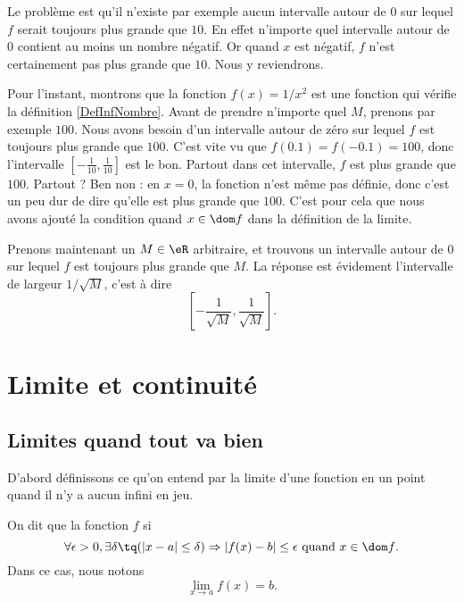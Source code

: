 Le problème est qu'il n'existe par exemple aucun intervalle autour de $0$ sur lequel $f$ serait toujours plus grande que $10$. En effet n'importe quel intervalle autour de $0$ contient au moins un nombre négatif. Or quand $x$ est négatif, $f$ n'est certainement pas plus grande que $10$. Nous y reviendrons.

Pour l'instant, montrons que la fonction $f(x)=1/x^2$ est une fonction qui vérifie la définition \ref{DefInfNombre}.  Avant de prendre n'importe quel $M$, prenons par exemple $100$. Nous avons besoin d'un intervalle autour de zéro sur lequel $f$ est toujours plus grande que $100$. C'est vite vu que $f(0.1)=f(-0.1)=100$, donc l'intervalle $[-\frac{ 1 }{ 10 },\frac{1}{ 10 }]$ est le bon. Partout dans cet intervalle, $f$ est plus grande que $100$. Partout ? Ben non : en $x=0$, la fonction n'est même pas définie, donc c'est un peu dur de dire qu'elle est plus grande que $100$. C'est pour cela que nous avons ajouté la condition \og quand $x\in\dom f$\fg{} dans la définition de la limite.

Prenons maintenant un $M\in\eR$ arbitraire, et trouvons un intervalle autour de $0$ sur lequel $f$ est toujours plus grande que $M$. La réponse est évidement l'intervalle de largeur $1/\sqrt{M}$, c'est à dire 
\[ 
  \left[ -\frac{ 1 }{ \sqrt{M} },\frac{ 1 }{ \sqrt{M} } \right].
\]

\section{Limite et continuité}


\subsection{Limites quand tout va bien}

D'abord définissons ce qu'on entend par la limite d'une fonction en un point quand il n'y a aucun infini en jeu.
\begin{definition}      \label{DefLimPointSansInfini}
 On dit que la fonction $f$  si 
\[ 
  \forall \epsilon>0,\exists\delta\tq (| x-a |\leq\delta)\Rightarrow | f(x)-b |\leq \epsilon\text{ quand $x\in\dom f$}.
\]
Dans ce cas, nous notons
\begin{equation}
\lim_{x\to a}f(x)=b.
\end{equation} 
\end{definition}

